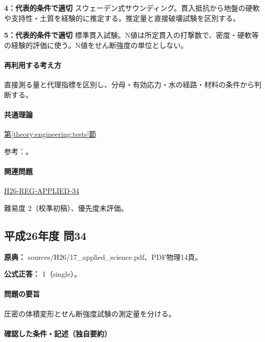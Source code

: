 \noindent\textbf{4：代表的条件で適切} スウェーデン式サウンディング。貫入抵抗から地盤の硬軟や支持性・土質を経験的に推定する。推定量と直接破壊試験を区別する。\par

\noindent\textbf{5：代表的条件で適切} 標準貫入試験。N値は所定貫入の打撃数で、密度・硬軟等の経験的評価に使う。N値をせん断強度の単位としない。\par

\paragraph{再利用する考え方} 直接測る量と代理指標を区別し、分母・有効応力・水の経路・材料の条件から判断する。

\paragraph{共通理論} \hyperref[theory:engineering:tests]{第\ref*{theory:engineering:tests}節}

\par 参考：\cite{eng52_geotech_tests,eng52_consolidation}。

\paragraph{関連問題} \hyperref[q:h26-reg-applied-34]{H26-REG-APPLIED-34}

\par 難易度 2（校準初稿）、優先度未評価。

\subsection{平成26年度 問34}
\label{q:h26-reg-applied-34}

\noindent\textbf{原典：} sources/H26/17\_applied\_science.pdf、PDF物理14頁。

\textbf{公式正答：} 1（single）。

\paragraph{問題の要旨} 圧密の体積変形とせん断強度試験の測定量を分ける。

\paragraph{確認した条件・記述（独自要約）}\mbox{}\par

